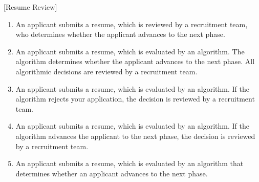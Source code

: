 [Resume Review]
\begin{enumerate}
\item An applicant submits a resume, which is reviewed by a recruitment team, who determines whether the applicant advances to the next phase.
\item An applicant submits a resume, which is evaluated by an algorithm. The algorithm determines whether the applicant advances to the next phase. All algorithmic decisions are reviewed by a recruitment team. 
\item An applicant submits a resume, which is evaluated by an algorithm. If the algorithm rejects your application, the decision is reviewed by a recruitment team. 
\item An applicant submits a resume, which is evaluated by an algorithm. If the algorithm advances the applicant to the next phase, the decision is reviewed by a recruitment team. 
\item An applicant submits a resume, which is evaluated by an algorithm that determines whether an applicant advances to the next phase. 
\end{enumerate}

